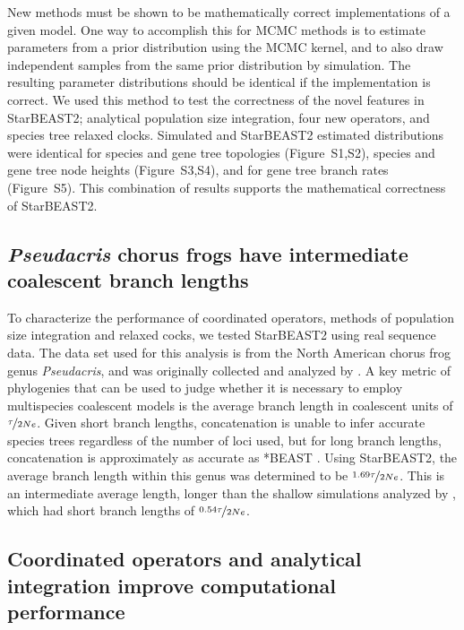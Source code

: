 \documentclass[12pt]{article}
\begin{document}
New methods must be shown to be mathematically correct implementations of a
given model. One way to accomplish this for MCMC methods is to estimate
parameters from a prior distribution using the MCMC kernel, and to also draw
independent samples from the same prior distribution by simulation. The
resulting parameter distributions should be identical if the implementation is
correct. We used this method to test the correctness of the novel features in
StarBEAST2; analytical population size integration, four new operators, and
species tree relaxed clocks. Simulated and StarBEAST2 estimated distributions
were identical for species and gene tree topologies (Figure~S1,S2), species and
gene tree node heights (Figure~S3,S4), and for gene tree branch rates (Figure~S5).
This combination of results supports the mathematical correctness of StarBEAST2.

\subsection{\textit{Pseudacris} chorus frogs have intermediate coalescent branch lengths}

To characterize the performance of coordinated operators, methods of population size
integration and relaxed cocks, we tested StarBEAST2 using real sequence data.
The data set used for this analysis is from the North American chorus frog genus
\textit{Pseudacris}, and was originally collected and analyzed by
\cite{Barrow201478}. A key metric of phylogenies that can be used to judge
whether it is necessary to employ multispecies coalescent models is the average
branch length in coalescent units of $\nicefrac{\tau}{2Ne}$. Given short branch
lengths, concatenation is unable to infer accurate species trees regardless of
the number of loci used, but for long branch lengths, concatenation is
approximately as accurate as *BEAST \citep{Ogilvie01052016}. Using StarBEAST2,
the average branch length within this genus was determined to be
$\nicefrac{1.69\tau}{2Ne}$. This is an intermediate average length, longer than
the shallow simulations analyzed by \cite{Ogilvie01052016}, which had short
branch lengths of $\nicefrac{0.54\tau}{2Ne}$.

\subsection{Coordinated operators and analytical integration improve computational performance}
\end{document}
